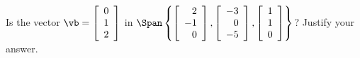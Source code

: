 

\item Is the vector $\vb = \left[ \begin{array}{c} 0\\1\\2 \end{array} \right]$ in $\Span\left\{ \left[ \begin{array}{r} 2\\-1\\0 \end{array} \right], \left[ \begin{array}{r} -3\\0\\-5 \end{array} \right], \left[ \begin{array}{c} 1\\1\\0 \end{array} \right] \right\}$? Justify your answer. 

